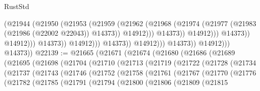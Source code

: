 \begin{lexlean}{RustStd}
\begin{coremodule}
                                                  (@21944
                                                    (@21950
                                                      (@21953
                                                        (@21959
                                                          (@21962
                                                            (@21968
                                                              (@21974
                                                                (@21977
                                                                  (@21983
                                                                    (@21986 (@22002 @22043))
                                                                    @14373))
                                                                @14912)))
                                                          @14373))
                                                      @14912)))
                                                @14373))
                                            @14912)))
                                      @14373))
                                  @14912)))
                            @14373))
                        @14912)))
                  @14373))
              @14912)))
        @14373))
@22139 := @21665
    (@21671
      (@21674
        (@21680
          (@21686
            (@21689
              (@21695
                (@21698
                  (@21704
                    (@21710
                      (@21713
                        (@21719
                          (@21722
                            (@21728
                              (@21734
                                (@21737
                                  (@21743
                                    (@21746
                                      (@21752
                                        (@21758
                                          (@21761
                                            (@21767
                                              (@21770
                                                (@21776
                                                  (@21782
                                                    (@21785
                                                      (@21791
                                                        (@21794
                                                          (@21800
                                                            (@21806
                                                              (@21809
                                                                (@21815

\end{coremodule}
\end{lexlean}
